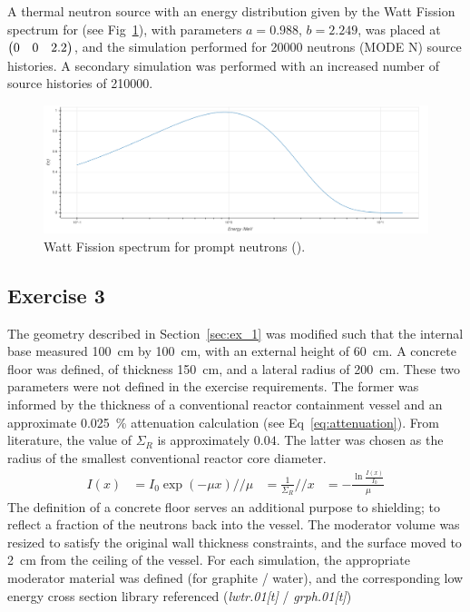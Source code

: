 \documentclass{article}
\begin{document}
    A thermal neutron source with an energy distribution given by the Watt Fission spectrum for  (see Fig~\ref{fig:watt_fission}), with parameters $a=0.988$, $b=2.249$, was placed at $\mqty(0 & 0 & 2.2)$, and the simulation performed for \num{20000} neutrons (MODE N) source histories. A secondary simulation was performed with an increased number of source histories of \num{210000}.
    \begin{figure}[htb]
      \centering
      \includegraphics[width=\textwidth]{watt_spectrum_235_u.png}
      \caption{Watt Fission spectrum for prompt neutrons ().} %
      \label{fig:watt_fission}
    \end{figure}

  \subsection{Exercise 3}
    The geometry described in Section~\ref{sec:ex_1} was modified such that the internal base measured \SI{100}{\cm} by \SI{100}{\cm}, with an external height of \SI{60}{\cm}.
    A concrete floor was defined, of thickness \SI{150}{\cm}, and a lateral radius of \SI{200}{\cm}. These two parameters were not defined in the exercise requirements. The former was informed by the thickness of a conventional reactor containment vessel\cite{nuclear_reactors} and an approximate \SI{0.025}{\percent} attenuation calculation (see Eq~\ref{eq:attenuation}). From literature, the value of $\Sigma_R$ is approximately $0.04$. The latter was chosen as the radius of the smallest conventional reactor core diameter. %
    \begin{align}
      \label{eq:attenuation}
      I(x)&=I_0\exp(-\mu x) //
      \mu &= \frac{1}{\Sigma_R}//
      x &= -\frac{\ln{\frac{I(x)}{I_0}}}{\mu}
    \end{align}
    The definition of a concrete floor serves an additional purpose to shielding; to reflect a fraction of the neutrons back into the vessel.
    The moderator volume was resized to satisfy the original wall thickness constraints, and the surface moved to \SI{2}{\cm} from the ceiling of the vessel. For each simulation, the appropriate moderator material was defined (for graphite / water), and the corresponding low energy cross section library referenced (\textit{lwtr.01[t]} / \textit{grph.01[t]})
\end{document}
